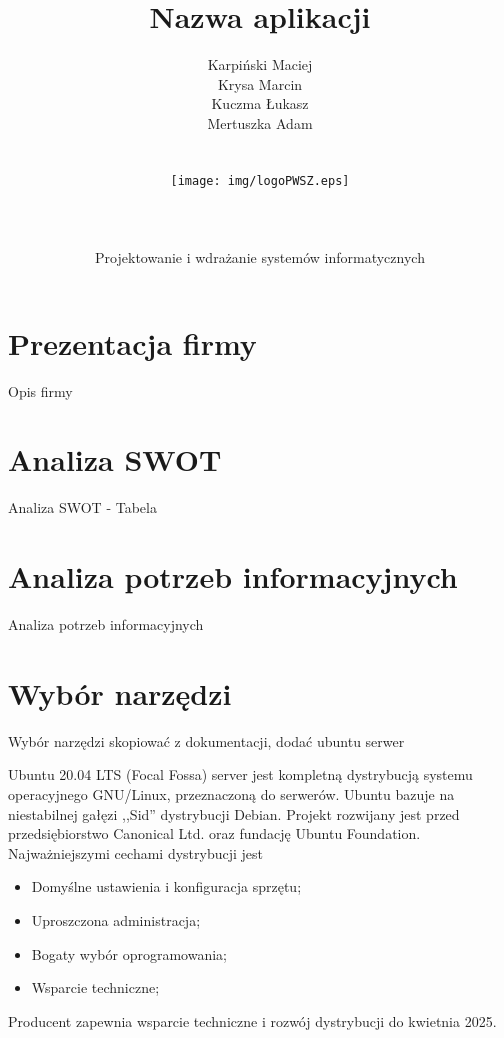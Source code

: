 \documentclass[12pt,a4paper]{article}
\author{Karpiński Maciej\\Krysa Marcin\\Kuczma Łukasz\\Mertuszka Adam\\\\\\\texttt{[image: img/logoPWSZ.eps]}\\\\\\\\Projektowanie i wdrażanie systemów informatycznych}
\title{Nazwa aplikacji}
\begin{document}
	\maketitle
	\thispagestyle{empty}
	\clearpage

	\tableofcontents
	\newpage

	\section{Prezentacja firmy}
		\indent Opis firmy
	\newpage

	\section{Analiza SWOT}
		\indent Analiza SWOT - Tabela
	\newpage
	
	\section{Analiza potrzeb informacyjnych}
		\indent Analiza potrzeb informacyjnych
	\newpage
	
	\section{Wybór narzędzi}
		\indent Wybór narzędzi skopiować z dokumentacji, dodać ubuntu serwer
		
		Ubuntu 20.04 LTS (Focal Fossa) server jest kompletną dystrybucją systemu operacyjnego GNU/Linux, przeznaczoną do serwerów. Ubuntu bazuje na niestabilnej gałęzi ,,Sid''
		dystrybucji Debian. Projekt rozwijany jest przed przedsiębiorstwo Canonical Ltd. oraz fundację Ubuntu Foundation. Najważniejszymi cechami dystrybucji jest
		\begin{itemize}
			\item Domyślne ustawienia i konfiguracja sprzętu;
			\item Uproszczona administracja;
			\item Bogaty wybór oprogramowania;
			\item Wsparcie techniczne;
		\end{itemize}
		Producent zapewnia wsparcie techniczne i rozwój dystrybucji do kwietnia 2025.
	\newpage
	
\end{document}
